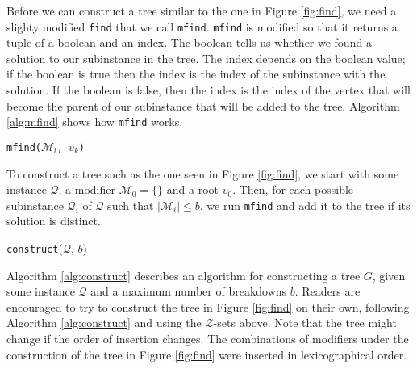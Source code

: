 Before we can construct a tree similar to the one in Figure \ref{fig:find},
we need a slighty modified \texttt{find} that we call \texttt{mfind}.
\texttt{mfind} is modified so that it returns a tuple of a boolean and an
index.
The boolean tells us whether we found a solution to our subinstance in the
tree.
The index depends on the boolean value; if the boolean is true then the index
is the index of the subinstance with the solution.
If the boolean is false, then the index is the index of the vertex that will
become the parent of our subinstance that will be added to the tree.
Algorithm \ref{alg:mfind} shows how \texttt{mfind} works.

\begin{algorithm}[ht!]
\caption{\texttt{mfind($\mathcal{M}_l$, $v_k$)}}
\label{alg:mfind}

\end{algorithm}
To construct a tree such as the one seen in Figure \ref{fig:find}, we start
with some instance $\mathcal{Q}$, a modifier $\mathcal{M}_0 = \{ {} \}$ and
a root $v_0$.
Then, for each possible subinstance $\mathcal{Q}_i$ of $\mathcal{Q}$ such that
$|\mathcal{M}_i| \leq b$, we run \texttt{mfind} and add it to the tree if its
solution is distinct.

\begin{algorithm}[ht!]
\caption{\texttt{construct}($\mathcal{Q}$, $b$)}
\label{alg:construct}

\end{algorithm}
Algorithm \ref{alg:construct} describes an algorithm for constructing a tree
$G$, given some instance $\mathcal{Q}$ and a maximum number of breakdowns $b$.
Readers are encouraged to try to construct the tree in Figure \ref{fig:find} on
their own, following Algorithm \ref{alg:construct} and using the
$\mathcal{Z}$-sets above. Note that the tree might change if the order of
insertion changes. The combinations of modifiers under the construction of the
tree in Figure \ref{fig:find} were inserted in lexicographical order.
